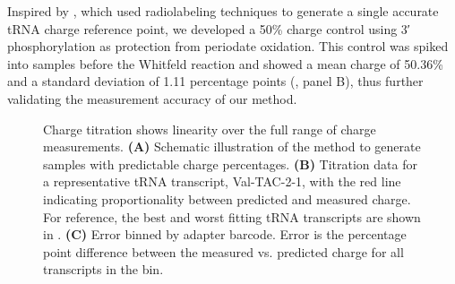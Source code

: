 \documentclass[9pt,lineno]{elife}
\begin{document}
Inspired by \cite{Evans2017-st}, which used radiolabeling techniques to generate a single accurate tRNA charge reference point, we developed a 50\% charge control using 3′ phosphorylation as protection from periodate oxidation.
This control was spiked into samples before the Whitfeld reaction and showed a mean charge of 50.36\% and a standard deviation of 1.11 percentage points (, panel B), thus further validating the measurement accuracy of our method.

\begin{figure}[ht!]
\centering
{}
\caption{
Charge titration shows linearity over the full range of charge measurements.
\textbf{(A)} Schematic illustration of the method to generate samples with predictable charge percentages.
\textbf{(B)} Titration data for a representative tRNA transcript, Val-TAC-2-1, with the red line indicating proportionality between predicted and measured charge.
For reference, the best and worst fitting tRNA transcripts are shown in .
\textbf{(C)} Error binned by adapter barcode.
Error is the percentage point difference between the measured vs. predicted charge for all transcripts in the bin.
}
\label{fig:Fig5}

\label{figsupp:f5S1}


\end{figure}
\end{document}
